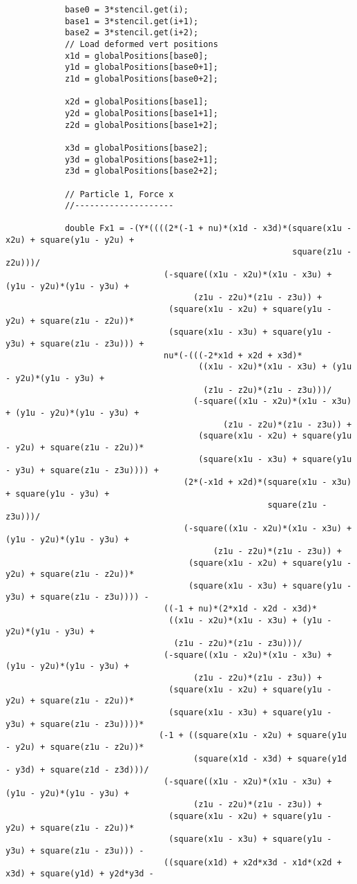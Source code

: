 \begin{lstlisting}
			base0 = 3*stencil.get(i);
			base1 = 3*stencil.get(i+1);
			base2 = 3*stencil.get(i+2);
			// Load deformed vert positions
			x1d = globalPositions[base0];
			y1d = globalPositions[base0+1];
			z1d = globalPositions[base0+2];
			
			x2d = globalPositions[base1];
			y2d = globalPositions[base1+1];
			z2d = globalPositions[base1+2];
			
			x3d = globalPositions[base2];
			y3d = globalPositions[base2+1];
			z3d = globalPositions[base2+2];
			
			// Particle 1, Force x
			//--------------------
			
			double Fx1 = -(Y*((((2*(-1 + nu)*(x1d - x3d)*(square(x1u - x2u) + square(y1u - y2u) + 
														  square(z1u - z2u)))/
								(-square((x1u - x2u)*(x1u - x3u) + (y1u - y2u)*(y1u - y3u) + 
									  (z1u - z2u)*(z1u - z3u)) + 
								 (square(x1u - x2u) + square(y1u - y2u) + square(z1u - z2u))*
								 (square(x1u - x3u) + square(y1u - y3u) + square(z1u - z3u))) + 
								nu*(-(((-2*x1d + x2d + x3d)*
									   ((x1u - x2u)*(x1u - x3u) + (y1u - y2u)*(y1u - y3u) + 
										(z1u - z2u)*(z1u - z3u)))/
									  (-square((x1u - x2u)*(x1u - x3u) + (y1u - y2u)*(y1u - y3u) + 
											(z1u - z2u)*(z1u - z3u)) + 
									   (square(x1u - x2u) + square(y1u - y2u) + square(z1u - z2u))*
									   (square(x1u - x3u) + square(y1u - y3u) + square(z1u - z3u)))) + 
									(2*(-x1d + x2d)*(square(x1u - x3u) + square(y1u - y3u) + 
													 square(z1u - z3u)))/
									(-square((x1u - x2u)*(x1u - x3u) + (y1u - y2u)*(y1u - y3u) + 
										  (z1u - z2u)*(z1u - z3u)) + 
									 (square(x1u - x2u) + square(y1u - y2u) + square(z1u - z2u))*
									 (square(x1u - x3u) + square(y1u - y3u) + square(z1u - z3u)))) - 
								((-1 + nu)*(2*x1d - x2d - x3d)*
								 ((x1u - x2u)*(x1u - x3u) + (y1u - y2u)*(y1u - y3u) + 
								  (z1u - z2u)*(z1u - z3u)))/
								(-square((x1u - x2u)*(x1u - x3u) + (y1u - y2u)*(y1u - y3u) + 
									  (z1u - z2u)*(z1u - z3u)) + 
								 (square(x1u - x2u) + square(y1u - y2u) + square(z1u - z2u))*
								 (square(x1u - x3u) + square(y1u - y3u) + square(z1u - z3u))))*
							   (-1 + ((square(x1u - x2u) + square(y1u - y2u) + square(z1u - z2u))*
									  (square(x1d - x3d) + square(y1d - y3d) + square(z1d - z3d)))/
								(-square((x1u - x2u)*(x1u - x3u) + (y1u - y2u)*(y1u - y3u) + 
									  (z1u - z2u)*(z1u - z3u)) + 
								 (square(x1u - x2u) + square(y1u - y2u) + square(z1u - z2u))*
								 (square(x1u - x3u) + square(y1u - y3u) + square(z1u - z3u))) - 
								((square(x1d) + x2d*x3d - x1d*(x2d + x3d) + square(y1d) + y2d*y3d - 

\end{lstlisting}
